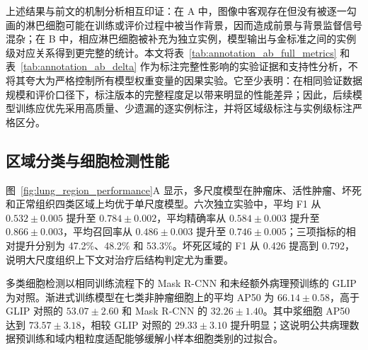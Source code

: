 上述结果与前文的机制分析相互印证：在 A 中，图像中客观存在但没有被逐一勾画的淋巴细胞可能在训练或评价过程中被当作背景，因而造成前景与背景监督信号混杂；在 B 中，相应淋巴细胞被补充为独立实例，模型输出与金标准之间的实例级对应关系得到更完整的统计。本文将表~\ref{tab:annotation_ab_full_metrics} 和表~\ref{tab:annotation_ab_delta} 作为标注完整性影响的实验证据和支持性分析，不将其夸大为严格控制所有模型权重变量的因果实验。它至少表明：在相同验证数据规模和评价口径下，标注版本的完整程度足以带来明显的性能差异；因此，后续模型训练应优先采用高质量、少遗漏的逐实例标注，并将区域级标注与实例级标注严格区分。

\subsection{区域分类与细胞检测性能}
图~\ref{fig:lung_region_performance}A 显示，多尺度模型在肿瘤床、活性肿瘤、坏死和正常组织四类区域上均优于单尺度模型。六次独立实验中，平均 F1 从 $0.532\pm0.005$ 提升至 $0.784\pm0.002$，平均精确率从 $0.584\pm0.003$ 提升至 $0.866\pm0.003$，平均召回率从 $0.486\pm0.003$ 提升至 $0.746\pm0.005$；三项指标的相对提升分别为 47.2\%、48.2\% 和 53.3\%。坏死区域的 F1 从 0.426 提高到 0.792，说明大尺度组织上下文对治疗后结构判定尤为重要。

多类细胞检测以相同训练流程下的 Mask R-CNN 和未经额外病理预训练的 GLIP 为对照。渐进式训练模型在七类非肿瘤细胞上的平均 AP50 为 $66.14\pm0.58$，高于 GLIP 对照的 $53.07\pm2.60$ 和 Mask R-CNN 的 $32.26\pm1.40$。其中浆细胞 AP50 达到 $73.57\pm3.18$，相较 GLIP 对照的 $29.33\pm3.10$ 提升明显；这说明公共病理数据预训练和域内粗粒度适配能够缓解小样本细胞类别的过拟合。

\begin{table}[htbp]
  \centering
  \caption{区域分类与细胞检测总体性能}
  \label{tab:lung_model_performance}
  \small
\end{table}

